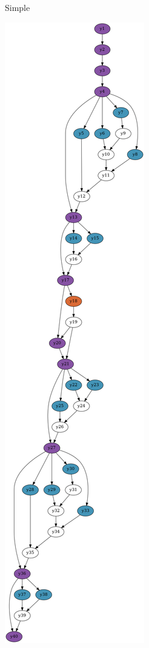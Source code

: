 \documentclass[../thesis.tex]{subfiles}
\begin{document}
\begin{figure}[htbp]
\begin{adjustwidth}{-2cm}{-2cm}
\begin{subfigure}{0.28\textwidth}
    \caption{Simple}
    \end{subfigure}
    \begin{subfigure}{0.28\textwidth}
      \centering
    \includegraphics[width=\textwidth]{graph_recursion2.png}

\end{subfigure}
\end{adjustwidth}
\end{figure}
\end{document}
